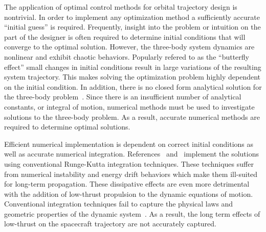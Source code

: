 \documentclass[preprint]{elsarticle}
\begin{document}
The application of optimal control methods for orbital trajectory design is nontrivial.
In order to implement any optimization method a sufficiently accurate ``initial guess'' is required.
Frequently, insight into the problem or intuition on the part of the designer is often required to determine initial conditions that will converge to the optimal solution.
However, the three-body system dynamics are nonlinear and exhibit chaotic behaviors. 
Popularly refered to as the ``butterfly effect'' small changes in initial conditions result in large variations of the resulting system trajectory. 
This makes solving the optimization problem highly dependent on the initial condition.
In addition, there is no closed form analytical solution for the three-body problem~\cite{szebehely1967}.
Since there is an insufficient number of analytical constants, or integral of motion, numerical methods must be used to investigate solutions to the three-body problem.
As a result, accurate numerical methods are required to determine optimal solutions.



Efficient numerical implementation is dependent on correct initial conditions as well as accurate numerical integration.
References~ and~ implement the solutions using conventional Runge-Kutta integration techniques.
These techniques suffer from numerical instability and energy drift behaviors which make them ill-suited for long-term propagation.
These dissipative effects are even more detrimental with the addition of low-thrust propulsion to the dynamic equations of motion.
Conventional integration techniques fail to capture the physical laws and geometric properties of the dynamic system~\cite{hairer2006}.
As a result, the long term effects of low-thrust on the spacecraft trajectory are not accurately captured. 
\end{document}
